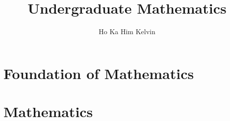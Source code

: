 \documentclass{book}
\title{Undergraduate Mathematics}
\author{Ho Ka Him Kelvin}
\renewcommand{\|}{\biggr|}
\begin{document}
\maketitle
     
    \tableofcontents
    \part{Foundation of Mathematics}
    
    
    
    
    
    \part{Mathematics}
\end{document}
